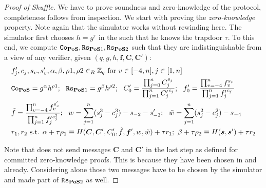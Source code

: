 
\begin{proof}[Proof of Shuffle]
We have to prove soundness and zero-knowledge of the \PoS protocol, completeness follows from inspection.
We start with proving the \emph{zero-knowledge} property.
Note again that the simulator works without rewinding here.
The simulator first chooses $h=g^\tau$ in the \crs such that he knows the trapdoor $\tau$.
To this end, we compute $\mathtt{Co}_\mathsf{\bf PoS}, \mathtt{Rs}_{\mathsf{\bf PoS}1}, \mathtt{Rs}_{\mathsf{\bf PoS}2}$ such that they are indistinguishable from a view of any verifier, given $(q,g,h,\bm f, \bm C, \bm C')$:
\begin{align*}
    & f'_j, c_j, s_v, s'_v, \alpha,\beta,\rho1,\rho2 \in_R \mathbb{Z}_q \text{ for } v\in[-4,n], j\in[1,n] \\
   & \mathtt{Co}_\mathsf{\bf PoS}=g^{\alpha}h^{\rho1};~~ \mathtt{Rs}_{\mathsf{\bf PoS}1}=g^{\beta}h^{\rho2};~~
    C'_0 = \frac{\prod_{j=0}^n C_j^{s_j}}{\prod_{j=1}^n {C'_j}^{c_j}};~~
    f'_0 = \frac{\prod_{v=-4}^n f_v^{s_v}}{\prod_{j=1}^n {f'_j}^{c_j}} \\
   & \tilde{f} = \frac{\prod_{v=-4}^n f_v^{s'_v}}{\prod_{j=1}^n {f'_j}^{c^2_j}};~~
    w = \sum_{j=1}^n (s_j^3 - c_j^3) - s_{-2} - s'_{-3};~~
    \tilde{w} = \sum_{j=1}^n (s_j^2 - c_j^2) - s_{-4} \\
   & r_1,r_2 \text{ s.t. } \alpha+\tau\rho_1\equiv H(\bm C, \bm C', C'_0, \tilde{f}, \bm f', w, \tilde{w}) + \tau r_1;~ \beta + \tau\rho_2 \equiv H(\bm s, \bm s') + \tau r_2 \\
\end{align*}

\vspace*{-1em}
\noindent
Note that \PoS does not send messages $\bm C$ and $\bm C'$ in the last step as defined for committed zero-knowledge proofs.
This is because they have been chosen in \PoM and \PoS already.
Considering \PoS alone those two messages have to be chosen by the simulator and made part of $\mathtt{Rs}_{\mathsf{\bf PoS}2}$ as well.



\end{proof}

